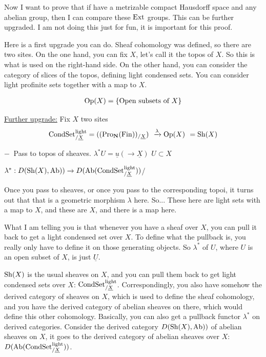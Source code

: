 Now I want to prove that if have a metrizable compact Hausdorff space and any abelian group, then I can compare these $\operatorname{Ext}$ groups. 
This can be further upgraded. I am not doing this just for fun, it is important for this proof.

Here is a first upgrade you can do. Sheaf cohomology was defined, so there are two sites. On the one hand, you can fix $X$, let's call it the topos of $X$. So this is what is used on the right-hand side. 
On the other hand, you can consider the category of slices of the topos, defining light condensed sets. You can consider light profinite sets together with a map to $X$.

\begin{align*}
\operatorname{Op}(X) = \{ \text{Open subsets of $X$} \}
\end{align*}

\underline{Further upgrade:}
Fix $X$
two sites
\begin{align*}
\mathrm{Cond}\mathrm{Set}_{/\underline{X}}^{\mathrm{light}} = ((\operatorname{Pro}_\mathbf N(\operatorname{Fin}))_{/\underline{X}})^{~} \xrightarrow{\lambda} \operatorname{Op}(X)^{~} = \operatorname{Sh}(X) 
\end{align*}

$-^{~}$ Pass to topos of sheaves.
$\lambda^\ast U = \underline{u} ( \to \underline{X})$
$ U \subset X$

$\lambda^\ast: D(\operatorname{Sh}(X),\mathrm{Ab})) \to D(\mathrm{Ab}(\mathrm{Cond}\mathrm{Set}_{/\underline{X}}^{\mathrm{light}}))$/

Once you pass to sheaves, or once you pass to the corresponding topoi, it turns out that that is a geometric morphism $\lambda$ here. So... These here are light sets with a map to $X$, and these are $X$, and there is a map here.

What I am telling you is that whenever you have a sheaf over $X$, you can pull it back to get a light condensed set over $X$. 
To define what the pullback is, you really only have to define it on those generating objects. So $\lambda^\ast$ of $U$, where $U$ is an open subset of $X$, is just $\underline{U}$.

$\operatorname{Sh}(X)$ is the usual sheaves on $X$, and you can pull them back to get light condensed sets over $X$: $\mathrm{Cond}\mathrm{Set}_{/\underline{X}}^{\mathrm{light}}$.
Correspondingly, you also have somehow the derived category of sheaves on $X$, which is used to define the sheaf cohomology, and you have the derived category of abelian sheaves on there, which would define this other cohomology.
Basically, you can also get a pullback functor $\lambda^\ast$ on derived categories.
Consider the derived category $D(\operatorname{Sh}(X),\mathrm{Ab}))$ of abelian sheaves on $X$, it goes to the derived category of abelian sheaves over $X$: $D(\mathrm{Ab}(\mathrm{Cond}\mathrm{Set}_{/\underline{X}}^{\mathrm{light}}))$.

